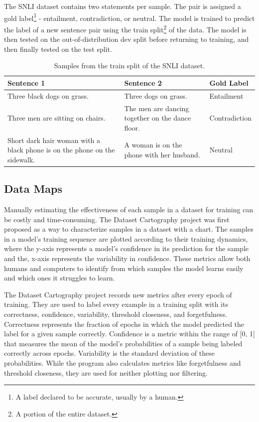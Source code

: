 \documentclass[11pt, a4paper, twocolumn]{article}
\begin{document}
	The SNLI dataset contains two statements per sample. The pair is assigned a gold label\footnote{A label declared to be accurate, usually by a human.} - entailment, contradiction, or neutral. The model is trained to predict the label of a new sentence pair using the train split\footnote{A portion of the entire dataset.} of the data. The model is then tested on the out-of-distribution dev split before returning to training, and then finally tested on the test split.
	
	\begin{table}[!ht]
		\centering
		\begin{tabular}{| m{5.75cm} | m{5.75cm}| m{2.5cm} |}
			\hline
			Sentence 1                                                                & Sentence 2                                       & Gold Label    \\ \hline
			Three black dogs on grass.                                                & Three dogs on grass.                             & Entailment    \\ \hline
			Three men are sitting on chairs.                                          & The men are dancing together on the dance floor. & Contradiction \\ \hline
			Short dark hair woman with a black phone is on the phone on the sidewalk. & A woman is on the phone with her husband.        & Neutral       \\
			\hline 
		\end{tabular}
		\caption{Samples from the train split of the SNLI dataset.}
	\end{table}
	
	\subsection{Data Maps}
	
	Manually estimating the effectiveness of each sample in a dataset for training can be costly and time-consuming. The Dataset Cartography project was first proposed as a way to characterize samples in a dataset with a chart. The samples in a model’s training sequence are plotted according to their training dynamics, where the y-axis represents a model’s confidence in its prediction for the sample and the, x-axis represents the variability in confidence. These metrics allow both humans and computers to identify from which samples the model learns easily and which ones it struggles to learn.
	
	The Dataset Cartography project records new metrics after every epoch of training. They are used to label every example in a training split with its correctness, confidence, variability, threshold closeness, and forgetfulness. Correctness represents the fraction of epochs in which the model predicted the label for a given sample correctly. Confidence is a metric within the range of [0, 1] that measures the mean of the model’s probabilities of a sample being labeled correctly across epochs. Variability is the standard deviation of these probabilities. While the program also calculates metrics like forgetfulness and threshold closeness, they are used for neither plotting nor filtering.
	
\end{document}
